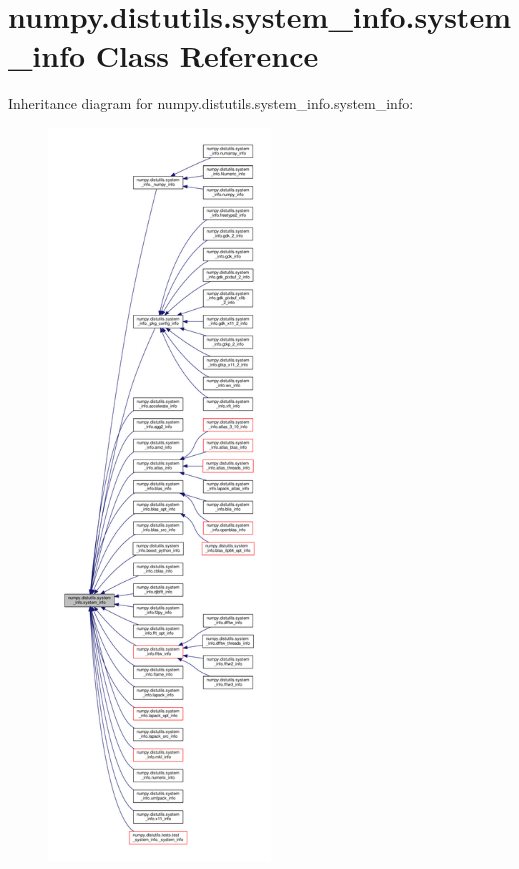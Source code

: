 \hypertarget{classnumpy_1_1distutils_1_1system__info_1_1system__info}{}\section{numpy.\+distutils.\+system\+\_\+info.\+system\+\_\+info Class Reference}
\label{classnumpy_1_1distutils_1_1system__info_1_1system__info}


Inheritance diagram for numpy.\+distutils.\+system\+\_\+info.\+system\+\_\+info\+:
\nopagebreak
\begin{figure}[H]
\begin{center}
\leavevmode
\includegraphics[height=550pt]{classnumpy_1_1distutils_1_1system__info_1_1system__info__inherit__graph}
\end{center}
\end{figure}

